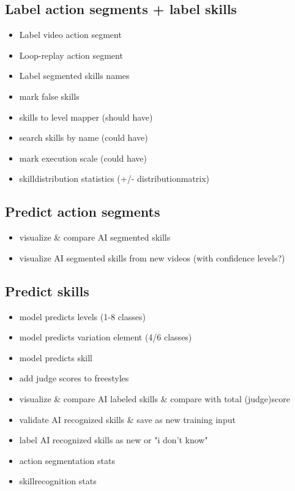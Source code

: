 \subsection{Label action segments + label skills}

\begin{itemize}
    \item Label video action segment
    \item Loop-replay action segment
    \item Label segmented skills names
    \item mark false skills
    \item skills to level mapper (should have)
    \item search skills by name (could have)
    \item mark execution scale (could have)
    \item skilldistribution statistics (+/- distributionmatrix)
\end{itemize}

\subsection{Predict action segments}

\begin{itemize}
    \item visualize \& compare AI segmented skills
    \item visualize AI segmented skills from new videos (with confidence levels?)
\end{itemize}


\subsection{Predict skills}

\begin{itemize}
    \item model predicts levels (1-8 classes)
    \item model predicts variation element (4/6 classes)
    \item model predicts skill
    \item add judge scores to freestyles
    \item visualize \& compare AI labeled skills \& compare with total (judge)score
    \item validate AI recognized skills \& save as new training input
    \item label AI recognized skills as new or "i don't know"
    \item action segmentation stats
    \item skillrecognition stats
\end{itemize}


